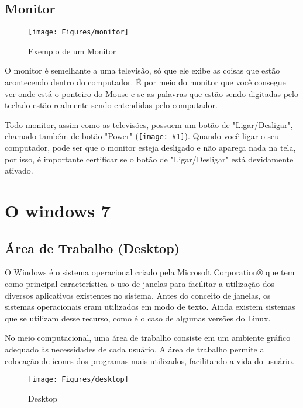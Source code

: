 \documentclass[hidelinks,12pt]{article}
\newcommand{\icon}[1]{\texttt{[image: \#1]}}
\begin{document}
\subsection{Monitor}

\begin{figure}[!h]
        \centering
		\texttt{[image: Figures/monitor]}
		\label{fig:monitor}
		\caption{Exemplo de um Monitor}
\end{figure}

O monitor é semelhante a uma televisão, só que ele exibe as coisas que estão acontecendo dentro do computador. É por meio do monitor que você consegue ver onde está o ponteiro do Mouse e se as palavras que estão sendo digitadas pelo teclado estão realmente sendo entendidas pelo computador.

Todo monitor, assim como as televisões, possuem um botão de "Ligar/Desligar", chamado também de botão "Power" (\icon{Figures/power}). Quando você ligar o seu computador, pode ser que o monitor esteja desligado e não apareça nada na tela, por isso, é importante certificar se o botão de "Ligar/Desligar" está devidamente ativado.

\section{O windows 7}
\subsection{Área de Trabalho (Desktop)}

O Windows é o sistema operacional criado pela Microsoft Corporation® que tem como principal característica o uso de janelas para facilitar a utilização dos diversos aplicativos existentes no sistema. Antes do conceito de janelas, os sistemas operacionais eram utilizados em modo de texto. Ainda existem sistemas que se utilizam desse recurso, como é o caso de algumas versões do Linux.

No meio computacional, uma área de trabalho consiste em um ambiente gráfico adequado às necessidades de cada usuário. A área de trabalho permite a colocação de ícones dos programas mais utilizados, facilitando a vida do usuário.\\

\begin{figure}[!hb]
	\centering
	\texttt{[image: Figures/desktop]}
	\caption{Desktop}
	\label{fig:desktop}
\end{figure}
\end{document}
